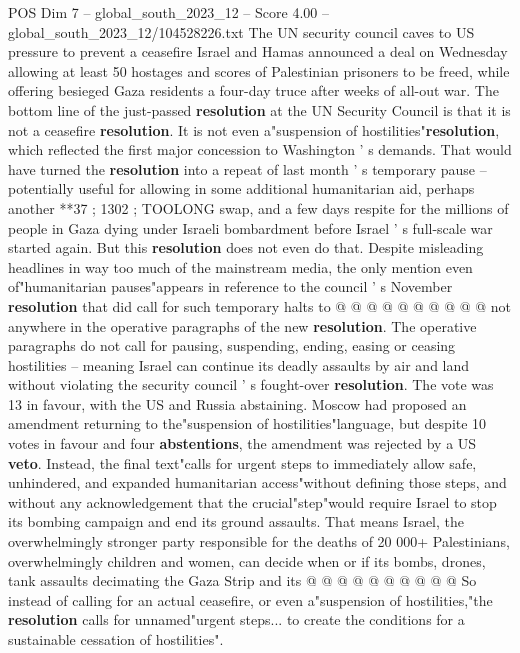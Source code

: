 \begin{textsample}{POS Dim 7 – global\_south\_2023\_12 – Score 4.00 – global\_south\_2023\_12/104528226.txt}  \label{ex:f7_pos_030}
The UN security council caves to US pressure to prevent a ceasefire Israel and Hamas announced a deal on Wednesday allowing at least 50 hostages and scores of Palestinian prisoners to be freed, while offering besieged Gaza residents a four-day truce after weeks of all-out war.
The bottom line of the just-passed \textbf{resolution} at the UN Security Council is that it is not a ceasefire \textbf{resolution}.
It is not even a"suspension of hostilities"\textbf{resolution}, which reflected the first major concession to Washington ' s demands.
That would have turned the \textbf{resolution} into a repeat of last month ' s temporary pause -- potentially useful for allowing in some additional humanitarian aid, perhaps another **37 ; 1302 ; TOOLONG swap, and a few days respite for the millions of people in Gaza dying under Israeli bombardment before Israel ' s full-scale war started again.
But this \textbf{resolution} does not even do that.
Despite misleading headlines in way too much of the mainstream media, the only mention even of"humanitarian pauses"appears in reference to the council ' s November \textbf{resolution} that did call for such temporary halts to @ @ @ @ @ @ @ @ @ @ not anywhere in the operative paragraphs of the new \textbf{resolution}.
The operative paragraphs do not call for pausing, suspending, ending, easing or ceasing hostilities -- meaning Israel can continue its deadly assaults by air and land without violating the security council ' s fought-over \textbf{resolution}.
The vote was 13 in favour, with the US and Russia abstaining.
Moscow had proposed an amendment returning to the"suspension of hostilities"language, but despite 10 votes in favour and four \textbf{abstentions}, the amendment was rejected by a US \textbf{veto}.
Instead, the final text"calls for urgent steps to immediately allow safe, unhindered, and expanded humanitarian access"without defining those steps, and without any acknowledgement that the crucial"step"would require Israel to stop its bombing campaign and end its ground assaults.
That means Israel, the overwhelmingly stronger party responsible for the deaths of 20 000+ Palestinians, overwhelmingly children and women, can decide when or if its bombs, drones, tank assaults decimating the Gaza Strip and its @ @ @ @ @ @ @ @ @ @ So instead of calling for an actual ceasefire, or even a"suspension of hostilities,"the \textbf{resolution} calls for unnamed"urgent steps... to create the conditions for a sustainable cessation of hostilities".

\end{textsample}
